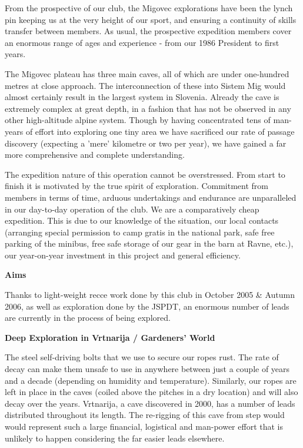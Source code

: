 From the prospective of our club, the Migovec explorations have been the lynch pin keeping us at the very height of our sport, and ensuring a continuity of skills transfer between members. As usual, the prospective expedition members cover an enormous range of ages and experience - from our 1986 President to first years.

The Migovec plateau has three main caves, all of which are under one-hundred metres at close approach. The interconnection of these into Sistem Mig would almost certainly result in the largest system in Slovenia. Already the cave is extremely complex at great depth, in a fashion that has not be observed in any other high-altitude alpine system. Though by having concentrated tens of man-years of effort into exploring one tiny area we have sacrificed our rate of passage discovery (expecting a 'mere' kilometre or two per year), we have gained a far more comprehensive and complete understanding.

The expedition nature of this operation cannot be overstressed. From start to finish it is motivated by the true spirit of exploration. Commitment from members in terms of time, arduous undertakings and endurance are unparalleled in our day-to-day operation of the club. We are a comparatively cheap expedition. This is due to our knowledge of the situation, our local contacts (arranging special permission to camp gratis in the national park, safe free parking of the minibus, free safe storage of our gear in the barn at Ravne, etc.), our year-on-year investment in this project and general efficiency.



\textbf{Aims}

Thanks to light-weight recce work done by this club in October 2005 \& Autumn 2006, as well as exploration done by the JSPDT, an enormous number of leads are currently in the process of being explored.


\textbf{Deep Exploration in Vrtnarija / Gardeners' World}

The steel self-driving bolts that we use to secure our ropes rust. The rate of decay can make them unsafe to use in anywhere between just a couple of years and a decade (depending on humidity and temperature). Similarly, our ropes are left in place in the caves (coiled above the pitches in a dry location) and will also decay over the years. Vrtnarija, a cave discovered in 2000, has a number of leads distributed throughout its length. The re-rigging of this cave from step would would represent such a large financial, logistical and man-power effort that is unlikely to happen considering the far easier leads elsewhere.


